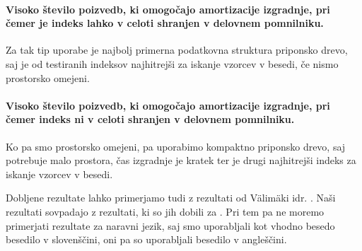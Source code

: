\paragraph{Visoko število poizvedb, ki omogočajo amortizacije izgradnje, pri čemer je indeks lahko v celoti shranjen v delovnem pomnilniku.} Za tak tip uporabe je najbolj primerna podatkovna struktura priponsko drevo, saj je od testiranih indeksov najhitrejši za iskanje vzorcev v besedi, če nismo prostorsko omejeni.

\paragraph{Visoko število poizvedb, ki omogočajo amortizacije izgradnje, pri čemer indeks ni v celoti shranjen v delovnem pomnilniku.} Ko pa smo prostorsko omejeni, pa uporabimo kompaktno priponsko drevo, saj potrebuje malo prostora, čas izgradnje je kratek ter je drugi najhitrejši indeks za iskanje vzorcev v besedi.


Dobljene rezultate lahko primerjamo tudi z rezultati od Välimäki idr. \cite{Valimaki2007}. Naši rezultati sovpadajo z rezultati, ki so jih dobili za \DNK. Pri tem pa ne moremo primerjati rezultate za naravni jezik, saj smo uporabljali kot vhodno besedo besedilo v slovenščini, oni pa so uporabljali besedilo v angleščini.